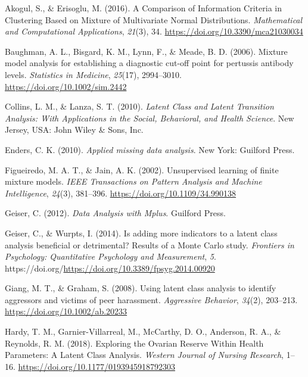 \documentclass[
  ,man,floatsintext]{apa6}
\newlength{\cslhangindent}
\newlength{\cslentryspacingunit} %
\newenvironment{CSLReferences}[2] %
 {%
  \setlength{\parindent}{0pt}
  \ifodd #1
  \let\oldpar\par
  \def\par{\hangindent=\cslhangindent\oldpar}
  \fi
  \setlength{\parskip}{#2\cslentryspacingunit}
 }%
 {}
\begin{document}
\hypertarget{refs}{}
\begin{CSLReferences}{1}{0}
\leavevmode{}%
Akogul, S., \& Erisoglu, M. (2016). A {Comparison} of {Information} {Criteria} in {Clustering} {Based} on {Mixture} of {Multivariate} {Normal} {Distributions}. \emph{Mathematical and Computational Applications}, \emph{21}(3), 34. \url{https://doi.org/10.3390/mca21030034}

\leavevmode{}%
Baughman, A. L., Bisgard, K. M., Lynn, F., \& Meade, B. D. (2006). Mixture model analysis for establishing a diagnostic cut-off point for pertussis antibody levels. \emph{Statistics in Medicine}, \emph{25}(17), 2994--3010. \url{https://doi.org/10.1002/sim.2442}

\leavevmode{}%
Collins, L. M., \& Lanza, S. T. (2010). \emph{Latent {Class} and {Latent} {Transition} {Analysis}: {With} {Applications} in the {Social}, {Behavioral}, and {Health} {Science}}. New Jersey, USA: John Wiley \& Sons, Inc.

\leavevmode{}%
Enders, C. K. (2010). \emph{Applied missing data analysis}. New York: Guilford Press.

\leavevmode{}%
Figueiredo, M. A. T., \& Jain, A. K. (2002). Unsupervised learning of finite mixture models. \emph{IEEE Transactions on Pattern Analysis and Machine Intelligence}, \emph{24}(3), 381--396. \url{https://doi.org/10.1109/34.990138}

\leavevmode{}%
Geiser, C. (2012). \emph{Data {Analysis} with {Mplus}}. Guilford Press.

\leavevmode{}%
Geiser, C., \& Wurpts, I. (2014). Is adding more indicators to a latent class analysis beneficial or detrimental? {Results} of a {Monte} {Carlo} study. \emph{Frontiers in Psychology: Quantitative Psychology and Measurement}, \emph{5}. https://doi.org/\url{https://doi.org/10.3389/fpsyg.2014.00920}

\leavevmode{}%
Giang, M. T., \& Graham, S. (2008). Using latent class analysis to identify aggressors and victims of peer harassment. \emph{Aggressive Behavior}, \emph{34}(2), 203--213. \url{https://doi.org/10.1002/ab.20233}

\leavevmode{}%
Hardy, T. M., Garnier-Villarreal, M., McCarthy, D. O., Anderson, R. A., \& Reynolds, R. M. (2018). Exploring the {Ovarian} {Reserve} {Within} {Health} {Parameters}: {A} {Latent} {Class} {Analysis}. \emph{Western Journal of Nursing Research}, 1--16. \url{https://doi.org/10.1177/0193945918792303}


\end{CSLReferences}
\end{document}
